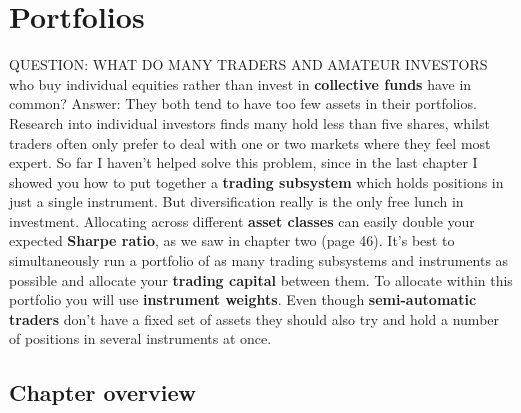 \chapter{Portfolios}

QUESTION: WHAT DO MANY TRADERS AND AMATEUR INVESTORS who buy individual equities rather than invest in \textbf{collective funds} have in common? Answer: They both tend to have too few assets in their portfolios. Research into individual investors finds many hold less than five shares, whilst traders often only prefer to deal with one or two markets where they feel most expert. So far I haven't helped solve this problem, since in the last chapter I showed you how to put together a \textbf{trading subsystem} which holds positions in just a single instrument. But diversification really is the only free lunch in investment. Allocating across different \textbf{asset classes} can easily double your expected \textbf{Sharpe ratio}, as we saw in chapter two (page 46). It's best to simultaneously run a portfolio of as many trading subsystems and instruments as possible and allocate your \textbf{trading capital} between them. To allocate within this portfolio you will use \textbf{instrument weights}. Even though \textbf{semi-automatic traders} don't have a fixed set of assets they should also try and hold a number of positions in several instruments at once.

\section*{Chapter overview}  {}

\begin{chapteroverviewtable}
\end{chapteroverviewtable}

